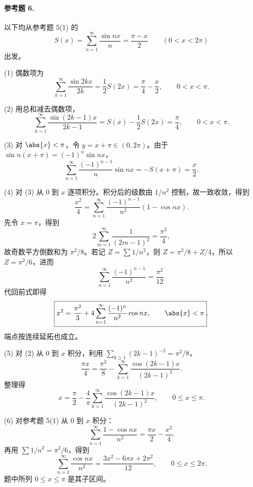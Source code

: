 \paragraph{参考题 6.}
\begin{xsolution}
以下均从参考题 5(1) 的
\[
  S(x)=\sum_{n=1}^{\infty}\frac{\sin nx}{n}=\frac{\pi-x}{2}
  \qquad(0<x<2\pi)
\]
出发。

(1) 偶数项为
\[
  \sum_{k=1}^{\infty}\frac{\sin2kx}{2k}=\frac12S(2x)
  =\boxed{\frac\pi4-\frac x2},\qquad0<x<\pi.
\]

(2) 用总和减去偶数项，
\[
  \sum_{k=1}^{\infty}\frac{\sin(2k-1)x}{2k-1}
  =S(x)-\frac12S(2x)=\boxed{\frac\pi4},
  \qquad0<x<\pi.
\]

(3) 对 $\abs{x}<\pi$，令 $y=x+\pi\in(0,2\pi)$。由于
$\sin n(x+\pi)=(-1)^n\sin nx$，
\[
  \sum_{n=1}^{\infty}\frac{(-1)^{n-1}}n\sin nx
  =-S(x+\pi)=\boxed{\frac x2}.
\]

(4) 对 (3) 从 $0$ 到 $x$ 逐项积分。积分后的级数由 $1/n^2$ 控制，故一致收敛，得到
\[
  \frac{x^2}{4}
  =\sum_{n=1}^{\infty}\frac{(-1)^{n-1}}{n^2}(1-\cos nx).
\]
先令 $x=\pi$，得到
\[
  2\sum_{m=1}^{\infty}\frac1{(2m-1)^2}=\frac{\pi^2}{4},
\]
故奇数平方倒数和为 $\pi^2/8$。若记 $Z=\sum1/n^2$，则
$Z=\pi^2/8+Z/4$，所以 $Z=\pi^2/6$，进而
\[
  \sum_{n=1}^{\infty}\frac{(-1)^{n-1}}{n^2}=\frac{\pi^2}{12}.
\]
代回前式即得
\[
  \boxed{\displaystyle
  x^2=\frac{\pi^2}{3}
  +4\sum_{n=1}^{\infty}\frac{(-1)^n}{n^2}\cos nx,
  \qquad\abs{x}<\pi }.
\]
端点按连续延拓也成立。

(5) 对 (2) 从 $0$ 到 $x$ 积分，利用
$\sum_{k\ge1}(2k-1)^{-2}=\pi^2/8$，
\[
  \frac{\pi x}{4}
  =\frac{\pi^2}{8}-
  \sum_{k=1}^{\infty}\frac{\cos(2k-1)x}{(2k-1)^2}.
\]
整理得
\[
  \boxed{\displaystyle
  x=\frac\pi2-\frac4\pi
  \sum_{k=1}^{\infty}\frac{\cos(2k-1)x}{(2k-1)^2},
  \qquad0\le x\le\pi }.
\]

(6) 对参考题 5(1) 从 $0$ 到 $x$ 积分：
\[
  \sum_{n=1}^{\infty}\frac{1-\cos nx}{n^2}
  =\frac{\pi x}{2}-\frac{x^2}{4}.
\]
再用 $\sum1/n^2=\pi^2/6$，得到
\[
  \boxed{\displaystyle
  \sum_{n=1}^{\infty}\frac{\cos nx}{n^2}
  =\frac{3x^2-6\pi x+2\pi^2}{12},
  \qquad0\le x\le2\pi }.
\]
题中所列 $0\le x\le\pi$ 是其子区间。
\end{xsolution}

